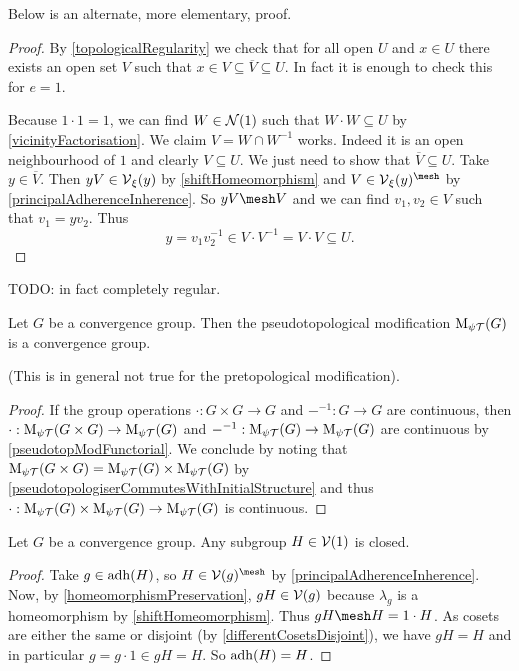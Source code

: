 Below is an alternate, more elementary, proof.
\begin{proof}
By \ref{topologicalRegularity} we check that for all open $U$ and $x\in U$ there exists an open set $V$ such that $x\in V\subseteq \overline{V}\subseteq U$. In fact it is enough to check this for $e = 1$.\

Because $1\cdot 1 = 1$, we can find $W\in\operatorname{\mathcal{N}}(1)$ such that $W\cdot W \subseteq U$ by \ref{vicinityFactorisation}. We claim $V= W\cap W^{-1}$ works. Indeed it is an open neighbourhood of $1$ and clearly $V\subseteq U$. We just need to show that $\overline{V}\subseteq U$. Take $y\in \overline{V}$. Then $yV\in \operatorname{\mathcal{V}}_\xi(y)$ by \ref{shiftHomeomorphism} and $V\in \vicinity_\xi(y)^{\mesh}$ by \ref{principalAdherenceInherence}. So $yV\mesh V$ and we can find $v_1,v_2\in V$ such that $v_1 = yv_2$. Thus
\[ y = v_1v_2^{-1} \in V\cdot V^{-1} = V\cdot V \subseteq U. \]
\end{proof}
TODO: in fact completely regular.

\begin{proposition}
Let $G$ be a convergence group. Then the pseudotopological modification $\operatorname{M_{\psi\mathcal{T}}}(G)$ is a convergence
group.
\end{proposition}
(This is in general not true for the pretopological modification).
\begin{proof}
If the group operations $\cdot: G\times G\to G$ and $-^{-1}: G\to G$ are continuous, then $\cdot: \operatorname{M_{\psi\mathcal{T}}}(G\times G)\to \operatorname{M_{\psi\mathcal{T}}}(G)$ and $-^{-1}: \operatorname{M_{\psi\mathcal{T}}}(G)\to \operatorname{M_{\psi\mathcal{T}}}(G)$ are continuous by \ref{pseudotopModFunctorial}. We conclude by noting that $\operatorname{M_{\psi\mathcal{T}}}(G\times G) = \operatorname{M_{\psi\mathcal{T}}}(G)\times \operatorname{M_{\psi\mathcal{T}}}(G)$ by \ref{pseudotopologiserCommutesWithInitialStructure} and thus $\cdot: \operatorname{M_{\psi\mathcal{T}}}(G)\times \operatorname{M_{\psi\mathcal{T}}}(G)\to \operatorname{M_{\psi\mathcal{T}}}(G)$ is continuous.
\end{proof}

\begin{proposition}
Let $G$ be a convergence group. Any subgroup $H\in\operatorname{\mathcal{V}}(1)$ is closed.
\end{proposition}
\begin{proof}
Take $g\in \operatorname{adh}(H)$, so $H\in \vicinity(g)^{\mesh}$ by \ref{principalAdherenceInherence}. Now, by \ref{homeomorphismPreservation}, $gH\in \operatorname{\mathcal{V}}(g)$ because $\lambda_g$ is a homeomorphism by \ref{shiftHomeomorphism}. Thus $gH \mesh H = 1\cdot H$. As cosets are either the same or disjoint (by \ref{differentCosetsDisjoint}), we have $gH = H$ and in particular $g = g\cdot 1 \in gH = H$. So $\operatorname{adh}(H) = H$.
\end{proof}

